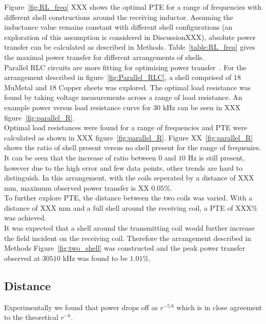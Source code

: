 \documentclass[11pt]{iopart}
\begin{document}
Figure~\ref{fig:RL_freq} XXX shows the optimal PTE for a range of
frequencies with different shell constructions around the receiving
inductor.  Assuming the inductance value remains constant with
different shell configurations (an exploration of this assumption is
considered in DiscussionXXX), absolute power transfer can be
calculated as described in Methods.  Table~\ref{table:RL_freq} gives
the maximal power transfer for different arrangements of shells.\\

Parallel RLC circuits are more fitting for optimising power
transfer~\cite{XXX}. For the arrangement described in
figure~\ref{fig:Parallel_RLC}, a shell comprised of $18$ MuMetal and $18$
Copper sheets was explored. The optimal load resistance was found by
taking voltage measurements across a range of load resistance. An
example power versus load resistance curve for $30$ kHz can be seen in
XXX figure~\ref{fig:parallel_R}.\\
Optimal load resistances were found for a range of frequencies and PTE
were calculated as shown in XXX figure~\ref{fig:parallel_R}. Figure
XX~\ref{fig:parallel_R} shows the ratio of shell present versus no
shell present for the range of frequenies. It can be seen that the
increase of ratio between $0$ and $10$ Hz is still present, however
due to the high error and few data points, other trends are hard to
distinguish. In this arrangement, with the coils seperated by a
distance of XXX mm, maximum observed power transfer is XX $0.05\%$.\\

To further explore PTE, the distance between the two coils was
varied. With a distance of XXX mm and a full shell around the
receiving coil, a PTE of XXX\% was achieved.\\

It was expected that a shell around the transmitting coil would
further increase the field incident on the receiving coil. Therefore
the arrangement described in Methods Figure~\ref{fig:two_shell} was
constructed and the peak power transfer observed at $30510$ kHz was
found to be $1.01\%$.\\


\subsection{Distance}
Experimentally we found that power drops off as $r^{-5.6}$ which is in close agreement to the theoretical $r^{-6}$.\\
\end{document}
